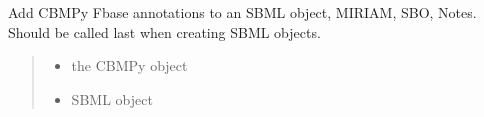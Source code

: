\documentclass[letterpaper,12pt,english]{sphinxmanual}
\begin{document}

\begin{fulllineitems}
\label{\detokenize{api/io:cbmpy.CBXML.sbml_setAnnotationsL3Fbc}}
\pysigstartsignatures
\pysiglinewithargsret
{}
{\sphinxparamcomma {}}
{}
\pysigstopsignatures
\sphinxAtStartPar
Add CBMPy Fbase annotations to an SBML object, MIRIAM, SBO, Notes. Should be called last when creating SBML objects.
\begin{quote}\begin{description}
\begin{itemize}
\item {} 
\sphinxAtStartPar
{} \textendash{} the CBMPy object

\item {} 
\sphinxAtStartPar
{} \textendash{} SBML object

\end{itemize}

\end{description}\end{quote}

\end{fulllineitems}

\end{document}
